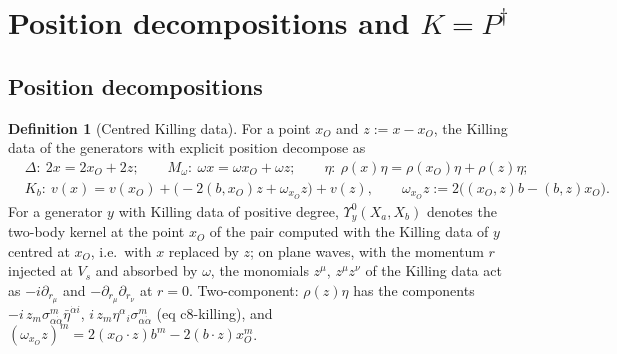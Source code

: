 \documentclass[11pt]{article}
\numberwithin{equation}{section}
\theoremstyle{plain}
\theoremstyle{definition}
\newtheorem{definition}[theorem]{Definition}
\begin{document}
\section{Position decompositions and $K=P^\dagger$}
\label{sec:op-bc}

\subsection{Position decompositions}

\begin{definition}[Centred Killing data]
\label{def:op-centred}
For a point $x_O$ and $z:=x-x_O$, the Killing data of the generators with explicit position decompose as
\[
\begin{aligned}
&\Delta:\ 2x=2x_O+2z;\qquad M_\omega:\ \omega x=\omega x_O+\omega z;\qquad \eta:\ \rho(x)\eta=\rho(x_O)\eta+\rho(z)\eta;\\
&K_b:\ v(x)=v(x_O)+\big(-2(b,x_O)z+\omega_{x_O}z\big)+v(z),\qquad \omega_{x_O}z:=2\big((x_O,z)b-(b,z)x_O\big).
\end{aligned}
\]
For a generator $y$ with Killing data of positive degree, $\Upsilon^0_y(X_a,X_b)$ denotes the two-body kernel at the point $x_O$ of the pair computed with the Killing data of $y$ centred at $x_O$, i.e.\ with $x$ replaced by $z$; on plane waves, with the momentum $r$ injected at $V_s$ and absorbed by $\omega$, the monomials $z^\mu$, $z^\mu z^\nu$ of the Killing data act as $-i\partial_{r_\mu}$ and $-\partial_{r_\mu}\partial_{r_\nu}$ at $r=0$. Two-component: $\rho(z)\eta$ has the components $-i\,z_m\sigma^m_{\alpha\dot\alpha}\bar\eta^{\dot\alpha i}$, $i\,z_m\eta^\alpha{}_i\sigma^m_{\alpha\dot\alpha}$ (eq c8-killing), and $(\omega_{x_O}z)^m=2(x_O\cdot z)b^m-2(b\cdot z)x_O^m$.
\end{definition}
\end{document}
